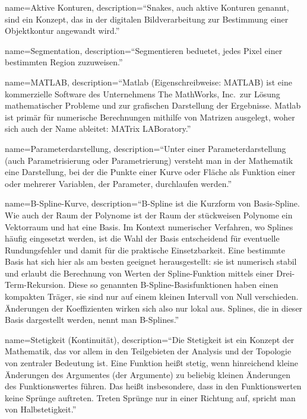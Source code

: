 {
    name=Aktive Konturen,
    description={``Snakes, auch aktive Konturen genannt, sind ein Konzept, das in der digitalen Bildverarbeitung zur Bestimmung einer Objektkontur angewandt wird.''~\cite{wiki:snakes}}
}

{
    name=Segmentation,
    description={``Segmentieren beduetet, jedes Pixel einer bestimmten Region zuzuweisen.''~\cite[S. 133]{hudritsch:script:cp}}
}

{
    name=MATLAB,
    description={``Matlab (Eigenschreibweise: MATLAB) ist eine kommerzielle Software des Unternehmens The MathWorks, Inc.\ zur Lösung mathematischer Probleme und zur grafischen Darstellung der Ergebnisse. Matlab ist primär für numerische Berechnungen mithilfe von Matrizen ausgelegt, woher sich auch der Name ableitet: MATrix LABoratory.''~\cite{wiki:matlab}}
}

{
    name=Parameterdarstellung,
    description={``Unter einer Parameterdarstellung (auch Parametrisierung oder Parametrierung) versteht man in der Mathematik eine Darstellung, bei der die Punkte einer Kurve oder Fläche als Funktion einer oder mehrerer Variablen, der Parameter, durchlaufen werden.''~\cite{wiki:parameter}}
}

{
    name=B-Spline-Kurve,
    description={``B-Spline ist die Kurzform von Basis-Spline. Wie auch der Raum der Polynome ist der Raum der stückweisen Polynome ein Vektorraum und hat eine Basis. Im Kontext numerischer Verfahren, wo Splines häufig eingesetzt werden, ist die Wahl der Basis entscheidend für eventuelle Rundungsfehler und damit für die praktische Einsetzbarkeit. Eine bestimmte Basis hat sich hier als am besten geeignet herausgestellt: sie ist numerisch stabil und erlaubt die Berechnung von Werten der Spline-Funktion mittels einer Drei-Term-Rekursion. Diese so genannten B-Spline-Basisfunktionen haben einen kompakten Träger, sie sind nur auf einem kleinen Intervall von Null verschieden. Änderungen der Koeffizienten wirken sich also nur lokal aus. Splines, die in dieser Basis dargestellt werden, nennt man B-Splines.''~\cite{wiki:bspline}}
}

{
    name=Stetigkeit (Kontinuität),
    description={``Die Stetigkeit ist ein Konzept der Mathematik, das vor allem in den Teilgebieten der Analysis und der Topologie von zentraler Bedeutung ist. Eine Funktion heißt stetig, wenn hinreichend kleine Änderungen des Argumentes (der Argumente) zu beliebig kleinen Änderungen des Funktionswertes führen. Das heißt insbesondere, dass in den Funktionswerten keine Sprünge auftreten. Treten Sprünge nur in einer Richtung auf, spricht man von Halbstetigkeit.''~\cite{wiki:kontinuitaet}}
}
